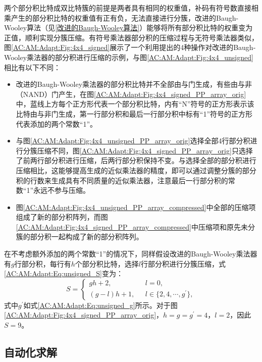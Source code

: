 两个部分积比特成双比特簇的前提是两者具有相同的权重值，补码有符号数直接相乘产生的部分积比特的权重值有正有负，无法直接进行分簇，改进的Baugh-Wooley算法\cite{EM:baugh-wooley,EM:baugh-wooley_modified_PP_reorga,EM:baugh-wooley_diff}（见\ref{改进的Baugh-Wooley算法}）能够将所有部分积比特的权重变为正值，顺利实现分簇压缩。有符号乘法器部分积的压缩过程与无符号乘法器类似，图\ref{AC:AM:Adapt:Fig:4x4_signed}展示了一个利用提出的4种操作对改进的Baugh-Wooley乘法器的部分积进行压缩的示例，与图\ref{AC:AM:Adapt:Fig:4x4_unsigned}相比有以下不同：
\begin{itemize}
    \item 改进的Baugh-Wooley乘法器的部分积比特并不全部由与门生成，有些由与非（NAND）门产生，在图\ref{AC:AM:Adapt:Fig:4x4_signed_PP_array_orig}中，蓝线上方每个正方形代表一个部分积比特，内有“N”符号的正方形表示该比特由与非门生成，第一行部分积和最后一行部分积中标有“1”符号的正方形代表添加的两个常数“1”。
    \item 与图\ref{AC:AM:Adapt:Fig:4x4_unsigned_PP_array_orig}选择全部4行部分积进行分簇压缩不同，图\ref{AC:AM:Adapt:Fig:4x4_signed_PP_array_orig}只选择了前两行部分积进行压缩，后两行部分积保持不变。与选择全部的部分积进行压缩相比，这能够提高生成的近似乘法器的精度，即可以通过调整分簇的部分积的行数来生成具有不同质量的近似乘法器，注意最后一行部分积的常数“1”永远不参与压缩。
    \item 图\ref{AC:AM:Adapt:Fig:4x4_unsigned_PP_array_compressed}中全部的压缩项组成了新的部分积阵列，而图\ref{AC:AM:Adapt:Fig:4x4_signed_PP_array_compressed}中压缩项和原先未分簇的部分积一起构成了新的部分积阵列。
\end{itemize}

在不考虑额外添加的两个常数“1”的情况下，同样假设改进的Baugh-Wooley乘法器有$g$行部分积，每行有$h$个部分积比特，选择$l$行部分积进行分簇压缩，式\eqref{AC:AM:Adapt:Eq:unsigned_S}变为：
\begin{equation}
    \label{AC:AM:Adapt:Eq:signed_S}
        S = \left\{
          \begin{aligned}
            gh + 2, \ \ \ & \ \ \ l = 0, \\
            (g - l)h + 1, & \ \ \ l \in \{2, 4, \cdots, g^{\prime} \},
          \end{aligned}
          \right.
\end{equation}
式中$g^{\prime}$如式\eqref{AC:AM:Adapt:Eq:unsigned_g}所示。对于图\ref{AC:AM:Adapt:Fig:4x4_signed_PP_array_orig}，$ h = g = g^{\prime} = 4 $，$ l = 2 $，因此$ S = 9 $。


\subsection{自动化求解}

